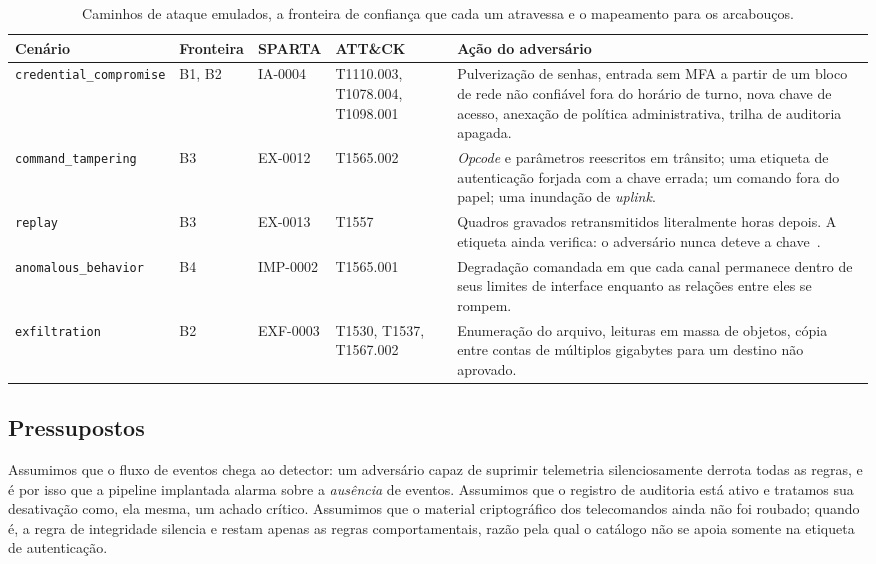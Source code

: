 \documentclass[conference]{IEEEtran}
\begin{document}
\begin{table}[t]
\caption{Caminhos de ataque emulados, a fronteira de confiança que cada um atravessa e o mapeamento para os arcabouços.}
\label{tab:paths}
\centering
\footnotesize
\begin{tabular}{@{}llllp{}@{}}
\toprule
\textbf{Cenário} & \textbf{Fronteira} & \textbf{SPARTA} & \textbf{ATT\&CK} & \textbf{Ação do adversário} \\
\midrule
\texttt{credential\_compromise} & B1, B2 & IA-0004 & T1110.003, T1078.004, T1098.001 &
Pulverização de senhas, entrada sem MFA a partir de um bloco de rede não
confiável fora do horário de turno, nova chave de acesso, anexação de política
administrativa, trilha de auditoria apagada. \\
\texttt{command\_tampering} & B3 & EX-0012 & T1565.002 &
\emph{Opcode} e parâmetros reescritos em trânsito; uma etiqueta de autenticação
forjada com a chave errada; um comando fora do papel; uma inundação de
\emph{uplink}. \\
\texttt{replay} & B3 & EX-0013 & T1557 &
Quadros gravados retransmitidos literalmente horas depois. A etiqueta ainda
verifica: o adversário nunca deteve a chave~\cite{syverson1994replay}. \\
\texttt{anomalous\_behavior} & B4 & IMP-0002 & T1565.001 &
Degradação comandada em que cada canal permanece dentro de seus limites de
interface enquanto as relações entre eles se rompem. \\
\texttt{exfiltration} & B2 & EXF-0003 & T1530, T1537, T1567.002 &
Enumeração do arquivo, leituras em massa de objetos, cópia entre contas de
múltiplos gigabytes para um destino não aprovado. \\
\bottomrule
\end{tabular}
\end{table}

\subsection{Pressupostos}

Assumimos que o fluxo de eventos chega ao detector: um adversário capaz de
suprimir telemetria silenciosamente derrota todas as regras, e é por isso que a
pipeline implantada alarma sobre a \emph{ausência} de eventos. Assumimos que o
registro de auditoria está ativo e tratamos sua desativação como, ela mesma, um
achado crítico. Assumimos que o material criptográfico dos telecomandos ainda
não foi roubado; quando é, a regra de integridade silencia e restam apenas as
regras comportamentais, razão pela qual o catálogo não se apoia somente na
etiqueta de autenticação.
\end{document}
